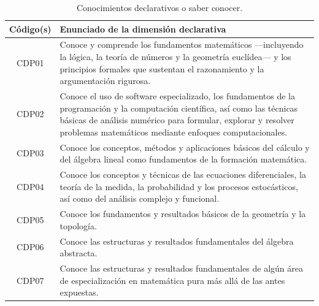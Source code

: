 \documentclass[11pt,a4paper]{article}
\begin{document}
\begin{table}[H]
\centering
\renewcommand{\arraystretch}{1.3}
\begin{tabular}{|c|p{9cm}|}
\hline
\cellcolor[HTML]{00C0F3}\textbf{Código(s)} & \cellcolor[HTML]{00C0F3}\textbf{Enunciado de la dimensión declarativa} \\
\hline
CDP01 & Conoce y comprende los fundamentos matemáticos —incluyendo la lógica, la teoría de números y la geometría euclídea— y los principios formales que sustentan el razonamiento y la argumentación rigurosa. \\
\hline
CDP02 & Conoce el uso de software especializado, los fundamentos de la programación y la computación científica, así como las técnicas básicas de análisis numérico para formular, explorar y resolver problemas matemáticos mediante enfoques computacionales. \\
\hline
CDP03 & Conoce los conceptos, métodos y aplicaciones básicos del cálculo y del álgebra lineal como fundamentos de la formación matemática. \\
\hline
CDP04 & Conoce los conceptos y técnicas de las ecuaciones diferenciales, la teoría de la medida, la probabilidad y los procesos estocásticos, así como del análisis complejo y funcional. \\
\hline
CDP05 & Conoce los fundamentos y resultados básicos de la geometría y la topología. \\
\hline
CDP06 & Conoce las estructuras y resultados fundamentales del álgebra abstracta. 
\\
\hline
CDP07 & Conoce las estructuras y resultados fundamentales de algún área de especialización en matemática pura más allá de las antes expuestas. 
\\
\hline
\end{tabular}
\caption{Conocimientos declarativos o saber conocer.}
\end{table}

\end{document}
